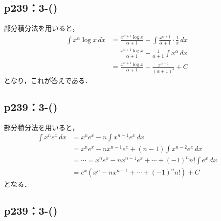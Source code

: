 \subsection*{p239：3-()}

\begin{tanswer}
    部分積分法を用いると，
    \begin{align*}
        \int x^\alpha \log x \, dx & = \frac{x^{\alpha +1} \log x}{\alpha +1}　- \int \frac{x^{\alpha +1}}{\alpha+1} \cdot \frac{1}{x} \, dx \\
                                   & = \frac{x^{\alpha +1} \log x}{\alpha +1}- \frac{1}{\alpha +1} \int x^{\alpha} \, dx                    \\
                                   & = \frac{x^{\alpha+1} \log x}{\alpha +1} - \frac{x^{\alpha +1}}{(\alpha +1)^2}+ C
    \end{align*}
    となり，これが答えである．
\end{tanswer}

\subsection*{p239：3-()}

\begin{tanswer}
    部分積分法を用いると，
    \begin{align*}
        \int x^n e^x \, dx & = x^n e^x - n \int x^{n-1} e^x \, dx                                   \\
                           & = x^n e^x - n x^{n-1} e^x + (n-1)\int x^{n-2} e^x \, dx                \\
                           & = \cdots = x^n e^x - n x^{n-1} e^x + \cdots + (-1)^n n! \int e^x \, dx \\
                           & = e^x (x^n -n x^{n-1}+ \cdots +(-1)^n n!) + C
    \end{align*}
    となる．
\end{tanswer}

\subsection*{p239：3-()}

